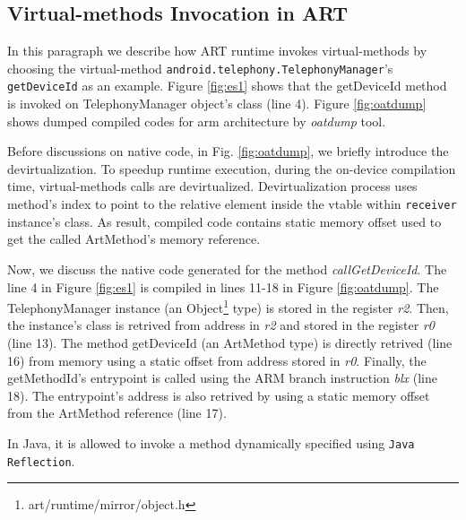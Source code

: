 \subsection{Virtual-methods Invocation in ART}
\label{subsub:artinvoke}
In this paragraph we describe how ART runtime invokes virtual-methods by choosing the virtual-method {\tt android.telephony.TelephonyManager}'s {\tt getDeviceId} as an example. Figure \ref{fig:es1} shows that the getDeviceId method is invoked on TelephonyManager object's class (line 4). Figure \ref{fig:oatdump} shows dumped compiled codes for arm architecture by \textit{oatdump} tool. 


%

%


Before discussions on native code, in Fig. \ref{fig:oatdump}, we briefly introduce the devirtualization. To speedup runtime execution, during the on-device compilation time, virtual-methods calls are devirtualized. Devirtualization process uses method's index to point to the relative element inside the vtable within {\tt receiver} instance's class.  As result, compiled code contains static memory offset used to get the called ArtMethod's memory reference. 
 

Now, we discuss the native code generated for the method \textit{callGetDeviceId}. The line 4 in Figure \ref{fig:es1} is compiled in lines 11-18 in Figure \ref{fig:oatdump}. The TelephonyManager instance (an Object\footnote{art/runtime/mirror/object.h} type) is stored in the register \textit{r2}. Then, the instance's class is retrived from address in \textit{r2} and stored in the register \textit{r0} (line 13). The method getDeviceId (an ArtMethod type) is directly retrived (line 16) from memory using a static offset from address stored in \textit{r0}. Finally, the getMethodId's entrypoint is called using the ARM branch instruction \textit{blx} (line 18). The entrypoint's address is also retrived by using a static memory offset from the ArtMethod reference (line 17). 


In Java, it is allowed to invoke a method dynamically specified using {\tt Java Reflection}. 

